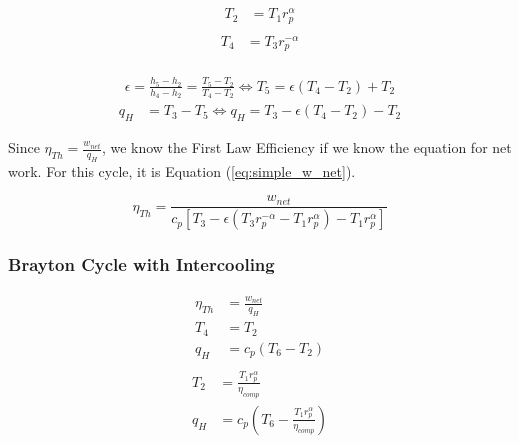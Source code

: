 \documentclass[
	12pt, %
]{brayton_cycle_report_style}
\begin{document}
\begin{multicols}{2}
  \begin{align*}
    T_{2} &= T_{1}r_{p}^\alpha\\
  \end{align*}
  \vspace{-1mm}
  \begin{align*}
    T_4 &= T_3r_p^{-\alpha}\\
  \end{align*}
\end{multicols}
\vspace{-10mm}
\begin{align*}
    \epsilon = \frac{h_5-h_2}{h_4-h_2} = \frac{T_5-T_2}{T_4-T_2} \iff T_5 = \epsilon(T_4-T_2)+ T_2
\end{align*}
\vspace{1mm}
\begin{align*}
    q_H &= T_3-T_5 \iff q_H = T_3-\epsilon(T_4-T_2) - T_2
\end{align*}
\vspace{2mm}

\noindent Since $\eta_{Th} = \frac{w_{net}}{q_H}$, we know the First Law Efficiency if we know the equation for net work. For this cycle, it is Equation (\ref{eq:simple_w_net}).

\begin{equation}
    \eta_{Th}=\frac{w_{net}}{c_p[T_3-\epsilon(T_3r_p^{-\alpha}-T_1r_p^\alpha)-T_1r_p^\alpha]}
\end{equation}

\subsubsection{Brayton Cycle with Intercooling} 

\vspace{-5mm}

\begin{multicols}{2}
  \begin{align*}
   \eta_{Th} &= \frac{w_{net}}{q_H}\\
    T_4 &= T_2\\
    q_H &= c_p(T_{6}-T_2)\\
  \end{align*}
  \vspace{1mm}
  \begin{align*}
    T_2 &= \frac{T_1r_p^\alpha}{\eta_{comp}}\\
    q_H &= c_p(T_{6}-\frac{T_1r_p^\alpha}{\eta_{comp}})
  \end{align*}
\end{multicols}
\end{document}
